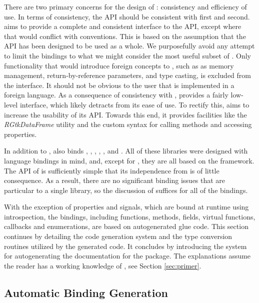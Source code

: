 \documentclass[article]{jss}
\begin{document}
There are two primary concerns for the design of : consistency
and efficiency of use. In terms of consistency, the API should be consistent 
with  first and  second.  aims to provide a 
complete and consistent interface to the  API, except where that would
conflict with  conventions. This is based on the assumption that the
 API has been designed to be used as a whole. We purposefully avoid 
any attempt to limit the bindings to what we might consider the most useful 
subset of . Only functionality that would introduce foreign concepts
to , such as as memory management, return-by-reference parameters, 
and type casting, is excluded from the  interface. It should not be
obvious to the user that  is implemented in a foreign language.
As a consequence of consistency with ,  provides a fairly 
low-level interface, which likely detracts from its ease of use. To rectify
this,  aims to increase the usability of its API. 
Towards this end, it provides facilities like the \emph{RGtkDataFrame} utility 
and the custom syntax for calling methods and accessing properties. 

In addition to ,  also binds
, , , , , and .
All of these libraries were designed with language bindings in mind, and, except
for , they are all based on the  framework. The API of
 is sufficiently simple that its independence from  is
of little consequence. As a result, there are no significant binding issues that
are particular to a single library, so the discussion of  suffices
for all of the bindings. 

With the exception of properties and signals, which are bound at runtime
using introspection, the  bindings, including functions, methods,
fields, virtual functions, callbacks and enumerations, are based on autogenerated glue code. 
This section continues by detailing the code generation system and the
type conversion routines utilized by the generated code. It concludes by 
introducing the system for autogenerating the  documentation for
the package. The explanations assume the reader has a working knowledge of 
, see Section \ref{sec:primer}.

\subsection{Automatic Binding Generation}
\end{document}
